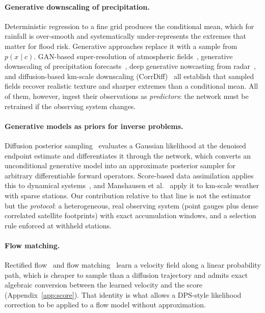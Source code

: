 \documentclass[10pt,twocolumn]{article}
\begin{document}
\paragraph{Generative downscaling of precipitation.}
Deterministic regression to a fine grid produces the conditional mean, which
for rainfall is over-smooth and systematically under-represents the extremes
that matter for flood risk. Generative approaches replace it with a sample
from $p(x\mid c)$. GAN-based super-resolution of atmospheric
fields~\cite{leinonen2021}, generative downscaling of precipitation
forecasts~\cite{harris2022}, deep generative nowcasting from
radar~\cite{ravuri2021}, and diffusion-based km-scale downscaling
(CorrDiff)~\cite{mardani2024} all establish that sampled fields recover
realistic texture and sharper extremes than a conditional mean. All of them,
however, ingest their observations as \emph{predictors}: the network must be
retrained if the observing system changes.

\paragraph{Generative models as priors for inverse problems.}
Diffusion posterior sampling~\cite{chung2023} evaluates a Gaussian likelihood
at the denoised endpoint estimate and differentiates it through the network,
which converts an unconditional generative model into an approximate posterior
sampler for arbitrary differentiable forward operators. Score-based data
assimilation applies this to dynamical
systems~\cite{rozet2023sda,rozet2023}, and Manshausen et
al.~\cite{manshausen2025} apply it to km-scale weather with sparse stations.
Our contribution relative to that line is not the estimator but the
\emph{protocol}: a heterogeneous, real observing system (point gauges plus
dense correlated satellite footprints) with exact accumulation windows, and a
selection rule enforced at withheld stations.

\paragraph{Flow matching.}
Rectified flow~\cite{liu2023} and flow
matching~\cite{lipman2023,albergo2023} learn a velocity field along a linear
probability path, which is cheaper to sample than a diffusion trajectory and
admits exact algebraic conversion between the learned velocity and the score
(Appendix~\ref{app:score}). That identity is what allows a DPS-style
likelihood correction to be applied to a flow model without approximation.
\end{document}
